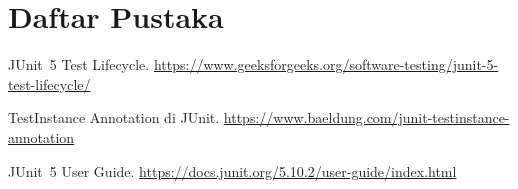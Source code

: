 \documentclass[a4paper,12pt]{article}
\begin{document}
\section{Daftar Pustaka}
\begin{enumerate}[label={[\arabic*]}]
    \item JUnit 5 Test Lifecycle. \url{https://www.geeksforgeeks.org/software-testing/junit-5-test-lifecycle/}
    \item TestInstance Annotation di JUnit. \url{https://www.baeldung.com/junit-testinstance-annotation}
    \item JUnit 5 User Guide. \url{https://docs.junit.org/5.10.2/user-guide/index.html}
\end{enumerate}
\end{document}
